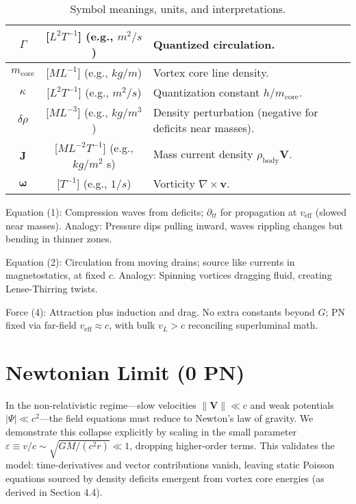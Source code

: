 \documentclass{article}
\begin{document}
\begin{table}[h!]
\begin{tabularx}{\textwidth}{|c|c|Y|}
\hline
$\Gamma$ & [$L^2 T^{-1}$] (e.g., $m^2/s$) & Quantized circulation. \\
\hline
$m_{\text{core}}$ & [$M L^{-1}$] (e.g., $kg/m$) & Vortex core line density. \\
\hline
$\kappa$ & [$L^2 T^{-1}$] (e.g., $m^2/s$) & Quantization constant $h / m_{\text{core}}$. \\
\hline
$\delta \rho$ & [$M L^{-3}$] (e.g., $kg/m^3$) & Density perturbation (negative for deficits near masses). \\
\hline
$\mathbf{J}$ & [$M L^{-2} T^{-1}$] (e.g., $kg/m^2$ s) & Mass current density $\rho_{\text{body}} \mathbf{V}$.\protect\footnotemark \\
\hline
$\boldsymbol{\omega}$ & [$T^{-1}$] (e.g., $1/s$) & Vorticity $\nabla \times \mathbf{v}$. \\
\hline
\end{tabularx}
\caption{Symbol meanings, units, and interpretations.\protect\footnotemark}
\end{table}



Equation (1): Compression waves from deficits; $\partial_{tt}$ for propagation at $v_{\text{eff}}$ (slowed near masses). Analogy: Pressure dips pulling inward, waves rippling changes but bending in thinner zones.

Equation (2): Circulation from moving drains; source like currents in magnetostatics, at fixed $c$. Analogy: Spinning vortices dragging fluid, creating Lense-Thirring twists.

Force (4): Attraction plus induction and drag. No extra constants beyond $G$; PN fixed via far-field $v_{\text{eff}} \approx c$, with bulk $v_L > c$ reconciling superluminal math.

\section{Newtonian Limit (0 PN)}

In the non-relativistic regime---slow velocities $\|\mathbf{V}\| \ll c$ and weak potentials $|\Psi| \ll c^2$---the field equations must reduce to Newton's law of gravity. We demonstrate this collapse explicitly by scaling in the small parameter $\varepsilon \equiv v/c \sim \sqrt{GM/(c^2 r)} \ll 1$, dropping higher-order terms. This validates the model: time-derivatives and vector contributions vanish, leaving static Poisson equations sourced by density deficits emergent from vortex core energies (as derived in Section 4.4).
\end{document}

